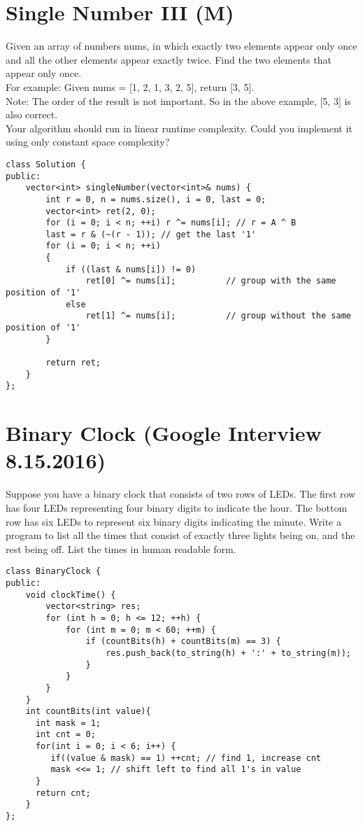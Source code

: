 \section{Single Number III (M)}
Given an array of numbers nums, in which exactly two elements appear only once and all the other elements appear exactly twice. Find the two elements that appear only once. \\

For example: Given nums = [1, 2, 1, 3, 2, 5], return [3, 5].\\

Note:
    The order of the result is not important. So in the above example, [5, 3] is also correct.\\
    Your algorithm should run in linear runtime complexity. Could you implement it using only constant space complexity?\\

\begin{lstlisting}
class Solution {
public:
    vector<int> singleNumber(vector<int>& nums) {
        int r = 0, n = nums.size(), i = 0, last = 0;
        vector<int> ret(2, 0);
        for (i = 0; i < n; ++i) r ^= nums[i]; // r = A ^ B
        last = r & (~(r - 1)); // get the last '1'
        for (i = 0; i < n; ++i)
        {
            if ((last & nums[i]) != 0)
                ret[0] ^= nums[i];          // group with the same position of '1'
            else
                ret[1] ^= nums[i];          // group without the same position of '1'
        }

        return ret;
    }
};
\end{lstlisting}


\section{Binary Clock (Google Interview 8.15.2016)}
Suppose you have a binary clock that consists of two rows of LEDs. The first row has four LEDs representing four binary digits to indicate the hour. The bottom row has six LEDs to represent six binary digits indicating the minute. Write a program to list all the times that consist of exactly three lights being on, and the rest being off. List the times in human readable form.\\

\begin{lstlisting}
class BinaryClock {
public:
    void clockTime() {
        vector<string> res;
        for (int h = 0; h <= 12; ++h) {
            for (int m = 0; m < 60; ++m) {
                if (countBits(h) + countBits(m) == 3) {
                    res.push_back(to_string(h) + ':' + to_string(m));
                }
            }
        }
    }
    int countBits(int value){
      int mask = 1;
      int cnt = 0;
      for(int i = 0; i < 6; i++) {
         if((value & mask) == 1) ++cnt; // find 1, increase cnt
         mask <<= 1; // shift left to find all 1's in value
      }
      return cnt;       
    }
};
\end{lstlisting}


